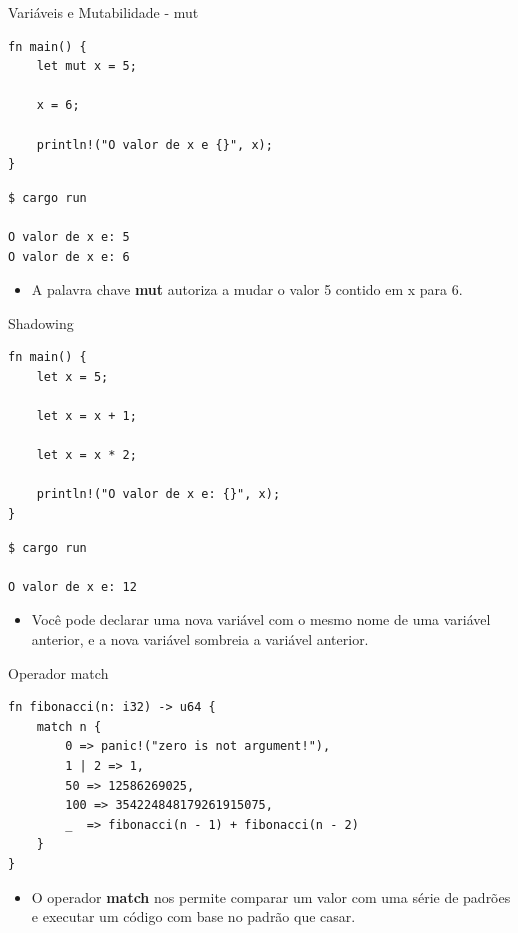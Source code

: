 \begin{frame}[fragile]{Variáveis e Mutabilidade - mut}
\lstset{language=Rust, style=boxed}
\begin{lstlisting}
fn main() {
    let mut x = 5;
    
    x = 6;

    println!("O valor de x e {}", x);
}
\end{lstlisting}

\begin{lstlisting}
$ cargo run

O valor de x e: 5
O valor de x e: 6
\end{lstlisting}
\begin{itemize}
    \item A palavra chave \textbf{mut} autoriza a mudar o valor 5 contido em x para 6.
\end{itemize}{}
\end{frame}

\begin{frame}[fragile]{Shadowing}
\lstset{language=Rust, style=boxed}
\begin{lstlisting}
fn main() {
    let x = 5;
    
    let x = x + 1;
    
    let x = x * 2;

    println!("O valor de x e: {}", x);
}
\end{lstlisting}

\begin{lstlisting}
$ cargo run

O valor de x e: 12
\end{lstlisting}
\begin{itemize}
    \item Você pode declarar uma nova variável com o mesmo nome de uma variável anterior, e a nova variável sombreia a variável anterior.
\end{itemize}
\end{frame}

\begin{frame}[fragile]{Operador match}
\lstset{language=Rust, style=boxed}
\begin{lstlisting}
fn fibonacci(n: i32) -> u64 {
    match n {
        0 => panic!("zero is not argument!"),
        1 | 2 => 1,
        50 => 12586269025,
        100 => 354224848179261915075,
        _  => fibonacci(n - 1) + fibonacci(n - 2)
    }
}
\end{lstlisting}
\begin{itemize}
    \item O operador \textbf{match} nos permite comparar um valor com uma série de padrões e executar um código com base no padrão que casar.
\end{itemize}
\end{frame}

